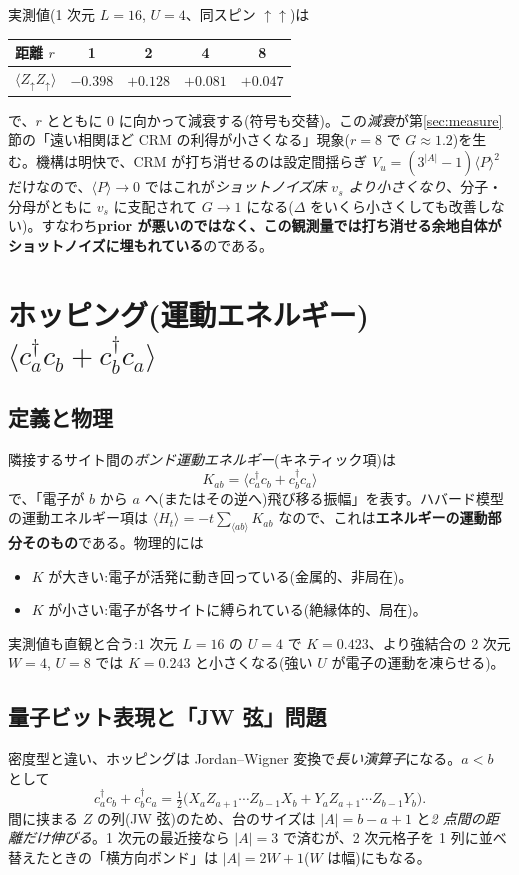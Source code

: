 \documentclass[11pt,a4paper]{ltjsarticle}
\newcommand{\ev}[1]{\langle #1\rangle}
\newcommand{\cd}{c^\dagger}
\newcommand{\up}{\uparrow}
\begin{document}
実測値(1 次元 $L=16$, $U=4$、同スピン $\up\up$)は
\begin{center}
\begin{tabular}{@{}lcccc@{}}
\toprule
距離 $r$ & 1 & 2 & 4 & 8 \\
\midrule
$\ev{Z_\up Z_\up}$ & $-0.398$ & $+0.128$ & $+0.081$ & $+0.047$ \\
\bottomrule
\end{tabular}
\end{center}
で、$r$ とともに $0$ に向かって減衰する(符号も交替)。この\emph{減衰}が第\ref{sec:measure}節の「遠い相関ほど CRM の利得が小さくなる」現象($r=8$ で $G\approx1.2$)を生む。機構は明快で、CRM が打ち消せるのは設定間揺らぎ $V_u=(3^{|A|}-1)\ev{P}^2$ だけなので、$\ev{P}\to0$ ではこれが\emph{ショットノイズ床 $v_s$ より小さくなり}、分子・分母がともに $v_s$ に支配されて $G\to1$ になる($\Delta$ をいくら小さくしても改善しない)。すなわち\textbf{prior が悪いのではなく、この観測量では打ち消せる余地自体がショットノイズに埋もれている}のである。

\section{ホッピング(運動エネルギー)$\ev{\cd_ac_b+\cd_bc_a}$}
\label{sec:hop}

\subsection{定義と物理}
隣接するサイト間の\emph{ボンド運動エネルギー}(キネティック項)は
\begin{equation}
  K_{ab} = \ev{\cd_{a}c_{b}+\cd_{b}c_{a}}
\end{equation}
で、「電子が $b$ から $a$ へ(またはその逆へ)飛び移る振幅」を表す。ハバード模型の運動エネルギー項は $\ev{H_t}=-t\sum_{\langle ab\rangle}K_{ab}$ なので、これは\textbf{エネルギーの運動部分そのもの}である。物理的には
\begin{itemize}
  \item $K$ が大きい:電子が活発に動き回っている(金属的、非局在)。
  \item $K$ が小さい:電子が各サイトに縛られている(絶縁体的、局在)。
\end{itemize}
実測値も直観と合う:$1$ 次元 $L=16$ の $U=4$ で $K=0.423$、より強結合の 2 次元 $W=4$, $U=8$ では $K=0.243$ と小さくなる(強い $U$ が電子の運動を凍らせる)。

\subsection{量子ビット表現と「JW 弦」問題}
密度型と違い、ホッピングは Jordan--Wigner 変換で\emph{長い演算子}になる。$a<b$ として
\begin{equation}
  \cd_ac_b+\cd_bc_a
  = \tfrac12\bigl(X_a Z_{a+1}\cdots Z_{b-1} X_b + Y_a Z_{a+1}\cdots Z_{b-1} Y_b\bigr).
\end{equation}
間に挟まる $Z$ の列(JW 弦)のため、台のサイズは $|A|=b-a+1$ と\emph{2 点間の距離だけ伸びる}。1 次元の最近接なら $|A|=3$ で済むが、2 次元格子を 1 列に並べ替えたときの「横方向ボンド」は $|A|=2W+1$($W$ は幅)にもなる。
\end{document}
